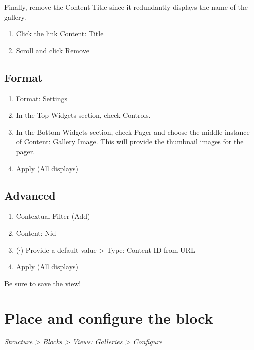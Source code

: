 \documentclass[letterpaper,10pt,english]{sphinxmanual}
\begin{document}
Finally, remove the Content Title since it redundantly displays the name of the gallery.
\begin{enumerate}
\item {} 
Click the link Content: Title

\item {} 
Scroll and click Remove

\end{enumerate}


\subsection{Format}
\label{slideshows:format}\begin{enumerate}
\item {} 
Format: Settings

\item {} 
In the Top Widgets section, check Controls.

\item {} 
In the Bottom Widgets section, check Pager and choose the middle instance of Content: Gallery Image. This will provide the thumbnail images for the pager.

\item {} 
Apply (All displays)

\end{enumerate}


\subsection{Advanced}
\label{slideshows:advanced}\begin{enumerate}
\item {} 
Contextual Filter (Add)

\item {} 
Content: Nid

\item {} 
(∙) Provide a default value \textgreater{} Type: Content ID from URL

\item {} 
Apply (All displays)

\end{enumerate}

Be sure to save the view!


\section{Place and configure the block}
\label{slideshows:place-and-configure-the-block}
\emph{Structure \textgreater{} Blocks \textgreater{} Views: Galleries \textgreater{} Configure}
\end{document}
